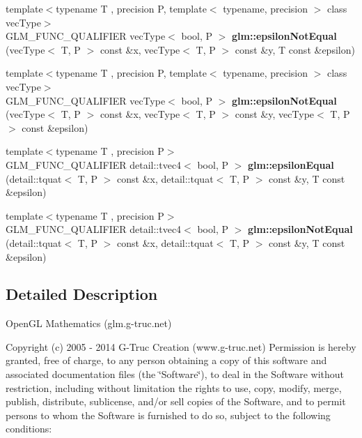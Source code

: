 \begin{DoxyCompactItemize}
\item 
{\footnotesize template$<$typename T , precision P, template$<$ typename, precision $>$ class vec\+Type$>$ }\\G\+L\+M\+\_\+\+F\+U\+N\+C\+\_\+\+Q\+U\+A\+L\+I\+F\+I\+ER vec\+Type$<$ bool, P $>$ {\bfseries glm\+::epsilon\+Not\+Equal} (vec\+Type$<$ T, P $>$ const \&x, vec\+Type$<$ T, P $>$ const \&y, T const \&epsilon)\hypertarget{namespaceglm_a76da74051c42eebf3256cd31464fa043}{}\label{namespaceglm_a76da74051c42eebf3256cd31464fa043}

\item 
{\footnotesize template$<$typename T , precision P, template$<$ typename, precision $>$ class vec\+Type$>$ }\\G\+L\+M\+\_\+\+F\+U\+N\+C\+\_\+\+Q\+U\+A\+L\+I\+F\+I\+ER vec\+Type$<$ bool, P $>$ {\bfseries glm\+::epsilon\+Not\+Equal} (vec\+Type$<$ T, P $>$ const \&x, vec\+Type$<$ T, P $>$ const \&y, vec\+Type$<$ T, P $>$ const \&epsilon)\hypertarget{namespaceglm_a34387d61360bf88bcca96b797f53e49d}{}\label{namespaceglm_a34387d61360bf88bcca96b797f53e49d}

\item 
{\footnotesize template$<$typename T , precision P$>$ }\\G\+L\+M\+\_\+\+F\+U\+N\+C\+\_\+\+Q\+U\+A\+L\+I\+F\+I\+ER detail\+::tvec4$<$ bool, P $>$ {\bfseries glm\+::epsilon\+Equal} (detail\+::tquat$<$ T, P $>$ const \&x, detail\+::tquat$<$ T, P $>$ const \&y, T const \&epsilon)\hypertarget{namespaceglm_a4c75af68224e0fea510364c0ef246a46}{}\label{namespaceglm_a4c75af68224e0fea510364c0ef246a46}

\item 
{\footnotesize template$<$typename T , precision P$>$ }\\G\+L\+M\+\_\+\+F\+U\+N\+C\+\_\+\+Q\+U\+A\+L\+I\+F\+I\+ER detail\+::tvec4$<$ bool, P $>$ {\bfseries glm\+::epsilon\+Not\+Equal} (detail\+::tquat$<$ T, P $>$ const \&x, detail\+::tquat$<$ T, P $>$ const \&y, T const \&epsilon)\hypertarget{namespaceglm_a7f1b10921333eeda77cd5c1f4a4b2101}{}\label{namespaceglm_a7f1b10921333eeda77cd5c1f4a4b2101}

\end{DoxyCompactItemize}


\subsection{Detailed Description}
Open\+GL Mathematics (glm.\+g-\/truc.\+net)

Copyright (c) 2005 -\/ 2014 G-\/\+Truc Creation (www.\+g-\/truc.\+net) Permission is hereby granted, free of charge, to any person obtaining a copy of this software and associated documentation files (the \char`\"{}\+Software\char`\"{}), to deal in the Software without restriction, including without limitation the rights to use, copy, modify, merge, publish, distribute, sublicense, and/or sell copies of the Software, and to permit persons to whom the Software is furnished to do so, subject to the following conditions\+:

